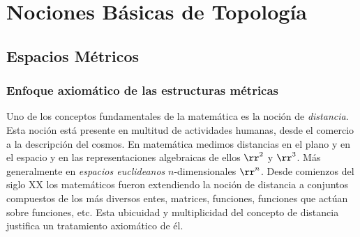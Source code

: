 
\chapter{Nociones Básicas de Topología }

\section{Espacios Métricos}

\subsection{Enfoque axiomático de las  estructuras métricas} 
Uno de los conceptos fundamentales de la matemática es la noción de \emph{distancia}. Esta noción está presente en multitud de actividades humanas, desde el comercio a la descripción del cosmos. En matemática medimos distancias en el plano y en el espacio y en las representaciones algebraicas de ellos  $\rr^2$ y $\rr^3$. Más generalmente  en  \emph{espacios euclideanos} $n$-dimensionales $\rr^n$. Desde comienzos del siglo XX los matemáticos fueron extendiendo la noción de distancia a conjuntos compuestos de los más diversos entes, matrices, funciones, funciones que actúan sobre funciones, etc. Esta ubicuidad y multiplicidad del concepto de distancia justifica un tratamiento axiomático de él.








